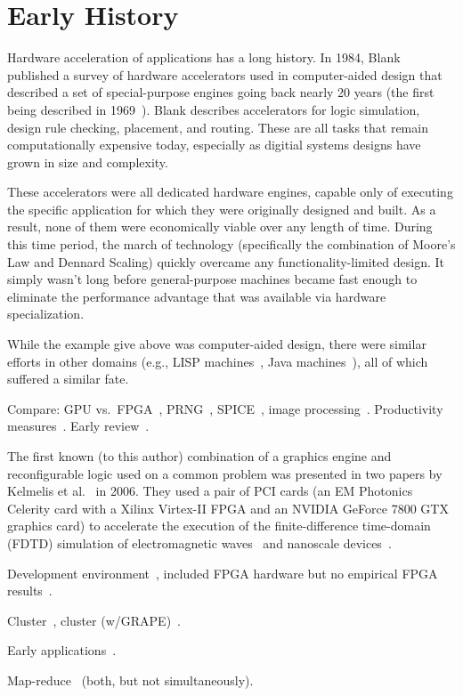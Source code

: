 \section{Early History}
\label{sec:history}

Hardware acceleration of applications has a long history.
In 1984, Blank~\cite{Blank84}
published a survey of hardware accelerators used in computer-aided design 
that described a set of special-purpose engines going back nearly 20 years
(the first being described in 1969~\cite{McKay69}).
Blank describes accelerators for logic simulation, design rule checking,
placement, and routing. These are all tasks that remain computationally
expensive today, especially as digitial systems designs have grown in size
and complexity.

These accelerators were all dedicated hardware engines, capable only
of executing the specific application for which they were originally designed
and built. As a result, none of them were economically viable over any
length of time.  During this time period, the march of technology (specifically
the combination of Moore's Law and Dennard Scaling) quickly
overcame any functionality-limited design.  It simply wasn't long
before general-purpose machines became fast enough to eliminate the
performance advantage that was available via hardware specialization.

While the example give above was computer-aided design, there were similar
efforts in other domains (e.g., LISP machines~\cite{lisp,alphalisp},
Java machines~\cite{java,Schoeberl08}),
all of which suffered a similar fate.

Compare: GPU vs.~FPGA~\cite{bnw+10,cls+08,cmhm10,cz09,jpbc10,sww+10,tb10},
PRNG~\cite{thl09,tb09}, SPICE~\cite{kd09}, image processing~\cite{amy09}.
Productivity measures~\cite{jpbc10}.
Early review~\cite{bdh+10}.

The first known (to this author) combination of a graphics engine and
reconfigurable logic used on a common problem was presented
in two papers
by Kelmelis et al.~\cite{khdo06,kdh+06} in 2006.  They used a pair of PCI cards
(an EM Photonics Celerity card with a Xilinx Virtex-II FPGA and
an NVIDIA GeForce 7800 GTX graphics card) to accelerate the execution of
the finite-difference time-domain (FDTD) simulation of electromagnetic
waves~\cite{khdo06} and nanoscale devices~\cite{kdh+06}.


Development environment~\cite{cft+10},
included FPGA hardware but no empirical FPGA results~\cite{dy08}.

Cluster~\cite{tl10}, cluster (w/GRAPE)~\cite{sbm+09}.

Early applications~\cite{bkdb10,khdo06,shsc08,tl10}.

Map-reduce~\cite{ytt+08} (both, but not simultaneously).

